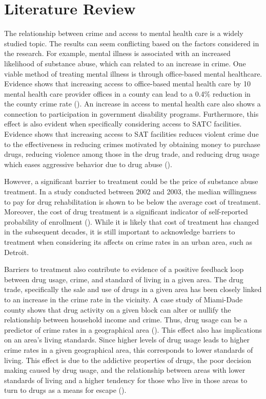 \documentclass[12pt]{article}
\begin{document}
\section{Literature Review} \label{sec:literature}
The relationship between crime and access to mental health care is a widely studied topic. The results can seem conflicting based on the factors considered in the research.  For example, mental illness is associated with an increased likelihood of substance abuse, which can related to an increase in crime. One viable method of treating mental illness is through office-based mental healthcare. Evidence shows that increasing access to office-based mental health care by 10 mental health care provider offices in a county can lead to a 0.4\% reduction in the county crime rate (\cite{mental_healthcare_and_crime}). An increase in access to mental health care also shows a connection to participation in government disability programs. Furthermore, this effect is also evident when specifically considering access to SATC facilities. Evidence shows that increasing access to SAT facilities reduces violent crime due to the effectiveness in reducing crimes motivated by obtaining money to purchase drugs, reducing violence among those in the drug trade, and reducing drug usage which eases aggressive behavior due to drug abuse (\cite{SAT_centers_and_crime}). 

However, a significant barrier to treatment could be the price of substance abuse treatment. In a study conducted between 2002 and 2003, the median willingness to pay for drug rehabilitation is shown to be below the average cost of treatment. Moreover, the cost of drug treatment is a significant indicator of self-reported probability of enrollment (\cite{cost_of_drug_treatment}). While it is likely that cost of treatment has changed in the subsequent decades, it is still important to acknowledge barriers to treatment when considering its affects on crime rates in an urban area, such as Detroit. 

Barriers to  treatment also contribute to evidence of a positive feedback loop between drug usage, crime, and standard of living in a given area. The drug trade, specifically the sale and use of drugs in a given area has been closely linked to an increase in the crime rate in the vicinity. A case study of Miami-Dade county shows that drug activity on a given block can alter or nullify the relationship between household income and crime. Thus, drug usage can be a predictor of crime rates in a geographical area (\cite{drugs_crime_space_time}). This effect also has implications on an area's living standards. Since higher levels of drug usage leads to higher crime rates in a given geographical area, this corresponds to lower standards of living. This effect is due to the addictive properties of drugs, the poor decision making caused by drug usage, and the relationship between areas with lower standards of living and a higher tendency for those who live in those areas to turn to drugs as a means for escape (\cite{drugs_and_crime}).
\end{document}
